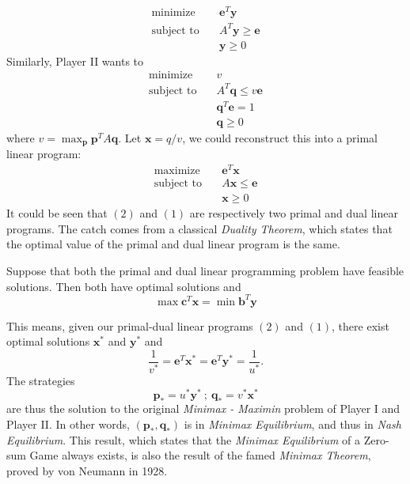 \documentclass[11pt,reqno, a4]{amsart}
\begin{document}
                \begin{equation}
                \begin{aligned}
                \text{minimize} & \quad \bm{e}^{T}\bm{y} \\
                \text{subject to} & \quad A^{T}\bm{y} \geq \bm{e}\\
                & \quad \bm{y} \geq 0
                \end{aligned}  
                \end{equation}
    Similarly, Player II wants to 
    \begin{align*}
        \text{minimize}& \quad v\\
        \text{subject to}& \quad A^T\bm{q} \leq v \bm{e}\\
        & \quad \bm{q}^T\bm{e} = 1\\
        & \quad \bm{q} \geq 0
    \end{align*}
    where $v = \max_{\bm{p}}\bm{p}^TA\bm{q}.$
    Let $\bm{x} = q/v$, we could reconstruct this into a primal linear program:  
        \begin{equation}
        \begin{aligned}
                \text{maximize} & \quad \bm{e}^{T}\bm{x} \\
                \text{subject to} & \quad A\bm{x} \leq \bm{e}\\
                & \quad \bm{x} \geq 0
        \end{aligned}            
        \end{equation}
    It could be seen that $(2)$ and $(1)$ are respectively two primal and dual linear programs. The catch comes from a classical \textit{Duality Theorem}, which states that the optimal value of the primal and dual linear program is the same.
\begin{theorem}
    Suppose that both the primal and dual linear programming problem have feasible solutions. Then both have optimal solutions and 
    \[
    \max \bm{c}^T\bm{x} = \min \bm{b}^T\bm{y}
    \]
\end{theorem}
This means, given our primal-dual linear programs $(2)$ and $(1)$, there exist optimal solutions $\bm{x^*}$ and $\bm{y}^*$ and 
    \[
    \frac{1}{v^*} = \bm{e}^T\bm{x}^* = \bm{e}^T\bm{y}^* = \frac{1}{u^*}.
    \]
The strategies 
\[
\bm{p}_* = u^*\bm{y}^* \ ; \ \bm{q}_* = v^*\bm{x}^*
\]
are thus the solution to the original \textit{Minimax - Maximin} problem of Player I and Player II. In other words, $(\bm{p}_*, \bm{q}_*)$ is in \textit{Minimax Equilibrium}, and thus in \textit{Nash Equilibrium}. This result, which states that the \textit{Minimax Equilibrium} of a Zero-sum Game always exists, is also the result of the famed \textit{Minimax Theorem}, proved by von Neumann in 1928.
\end{document}
